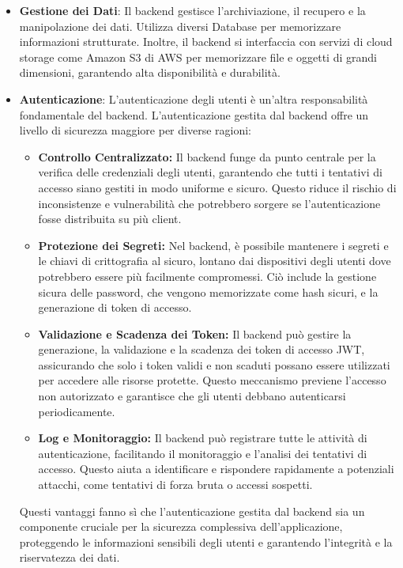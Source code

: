 \begin{itemize}
    \item \textbf{Gestione dei Dati}: Il backend gestisce l'archiviazione, il recupero e la manipolazione dei dati.
    Utilizza diversi Database per memorizzare informazioni strutturate. Inoltre, il backend si interfaccia con servizi di cloud storage come Amazon S3 di AWS per memorizzare file e oggetti di grandi dimensioni, garantendo alta disponibilità e durabilità.
    \item \textbf{Autenticazione}: L'autenticazione degli utenti è un'altra responsabilità fondamentale del backend. L'autenticazione gestita dal backend offre un livello di sicurezza maggiore per diverse ragioni:
    \begin{itemize}
        \item \textbf{Controllo Centralizzato:} Il backend funge da punto centrale per la verifica delle credenziali degli utenti, garantendo che tutti i tentativi di accesso siano gestiti in modo uniforme e sicuro.
        Questo riduce il rischio di inconsistenze e vulnerabilità che potrebbero sorgere se l'autenticazione fosse distribuita su più client.
        \item \textbf{Protezione dei Segreti:} Nel backend, è possibile mantenere i segreti e le chiavi di crittografia al sicuro, lontano dai dispositivi degli utenti dove potrebbero essere più facilmente compromessi.
        Ciò include la gestione sicura delle password, che vengono memorizzate come hash sicuri, e la generazione di token di accesso.
        \item \textbf{Validazione e Scadenza dei Token:} Il backend può gestire la generazione, la validazione e la scadenza dei token di accesso JWT, assicurando che solo i token validi e non scaduti possano essere utilizzati per accedere alle risorse protette.
        Questo meccanismo previene l'accesso non autorizzato e garantisce che gli utenti debbano autenticarsi periodicamente.
        \item \textbf{Log e Monitoraggio:} Il backend può registrare tutte le attività di autenticazione, facilitando il monitoraggio e l'analisi dei tentativi di accesso.
        Questo aiuta a identificare e rispondere rapidamente a potenziali attacchi, come tentativi di forza bruta o accessi sospetti.
    \end{itemize}
    Questi vantaggi fanno sì che l'autenticazione gestita dal backend sia un componente cruciale per la sicurezza complessiva dell'applicazione, proteggendo le informazioni sensibili degli utenti e garantendo l'integrità e la riservatezza dei dati.

\end{itemize}
